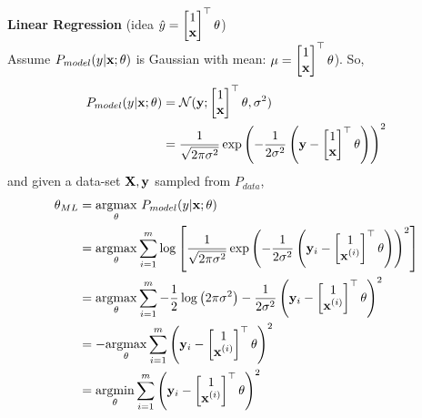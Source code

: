 \begin{example}
    \textbf{Linear Regression} (idea $\hat{y} = \begin{bmatrix} 1 \\ \vx \end{bmatrix}^\top\vtheta$) \\
    Assume $P_{model}(y|\vx ; \vtheta)$ is Gaussian with mean: $\mu = \begin{bmatrix} 1 \\ \vx \end{bmatrix}^\top\vtheta$).
    So, 
    \begin{align*}
        P_{model}(y|\vx;\theta) &= \Normal(\vy;\begin{bmatrix} 1 \\ \vx \end{bmatrix}^\top\vtheta,\sigma^2)\\
        &=\frac{1}{\sqrt{2\pi\sigma^2}}\exp{\left(-\frac{1}{2\sigma^2}\left(\vy - \begin{bmatrix} 1 \\ \vx \end{bmatrix}^\top\vtheta \right) \right)^2} \\
    \end{align*}
    and given a data-set $\MX,\vy$ sampled from $P_{data}$, 
    \begin{align*}
        \vtheta_{ML} & = \underset{\vtheta}{\argmax}\ P_{model}(y|\vx;\theta) \\
        &= \underset{\vtheta}{\argmax}\sum_{i=1}^m\log\left[\frac{1}{\sqrt{2\pi\sigma^2}}\exp{\left(-\frac{1}{2\sigma^2}\left(\vy_i - \begin{bmatrix} 1 \\ \vx^{(i)} \end{bmatrix}^\top\vtheta \right) \right)^2} \right]\\
        &= \underset{\vtheta}{\argmax}\sum_{i=1}^m -\frac{1}{2}\log\left(2\pi\sigma^2\right) - \frac{1}{2\sigma^2}\left(\vy_i - \begin{bmatrix} 1 \\ \vx^{(i)} \end{bmatrix}^\top\vtheta \right)^2\\
        &= -\underset{\vtheta}{\argmax}\sum_{i=1}^m\left(\vy_i - \begin{bmatrix} 1 \\ \vx^{(i)} \end{bmatrix}^\top\vtheta \right)^2\\
        &= \underset{\vtheta}{\argmin}\sum_{i=1}^m\left(\vy_i - \begin{bmatrix} 1 \\ \vx^{(i)} \end{bmatrix}^\top\vtheta \right)^2\\

\end{align*}
\end{example}
